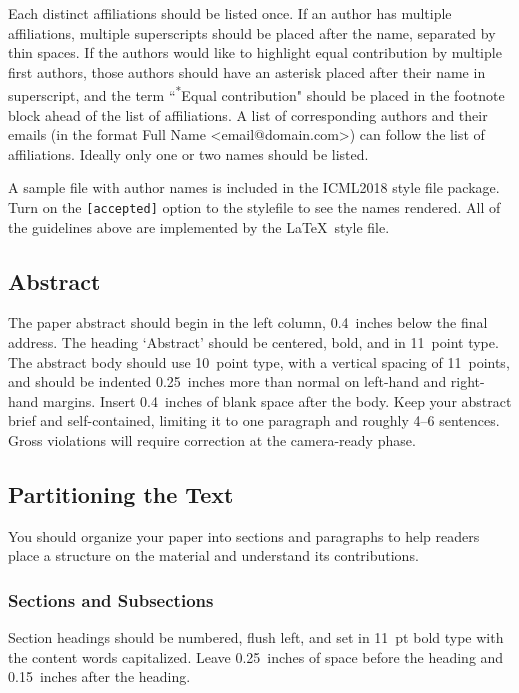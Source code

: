 \documentclass{article}
\begin{document}
Each distinct affiliations should be listed once. If an author has multiple
affiliations, multiple superscripts should be placed after the name, separated
by thin spaces. If the authors would like to highlight equal contribution by
multiple first authors, those authors should have an asterisk placed after their
name in superscript, and the term ``\textsuperscript{*}Equal contribution"
should be placed in the footnote block ahead of the list of affiliations. A
list of corresponding authors and their emails (in the format Full Name
\textless{}email@domain.com\textgreater{}) can follow the list of affiliations.
Ideally only one or two names should be listed.

A sample file with author names is included in the ICML2018 style file
package. Turn on the \texttt{[accepted]} option to the stylefile to
see the names rendered. All of the guidelines above are implemented
by the \LaTeX\ style file.

\subsection{Abstract}

The paper abstract should begin in the left column, 0.4~inches below the final
address. The heading `Abstract' should be centered, bold, and in 11~point type.
The abstract body should use 10~point type, with a vertical spacing of
11~points, and should be indented 0.25~inches more than normal on left-hand and
right-hand margins. Insert 0.4~inches of blank space after the body. Keep your
abstract brief and self-contained, limiting it to one paragraph and roughly 4--6
sentences. Gross violations will require correction at the camera-ready phase.

\subsection{Partitioning the Text}

You should organize your paper into sections and paragraphs to help
readers place a structure on the material and understand its
contributions.

\subsubsection{Sections and Subsections}

Section headings should be numbered, flush left, and set in 11~pt bold
type with the content words capitalized. Leave 0.25~inches of space
before the heading and 0.15~inches after the heading.
\end{document}
